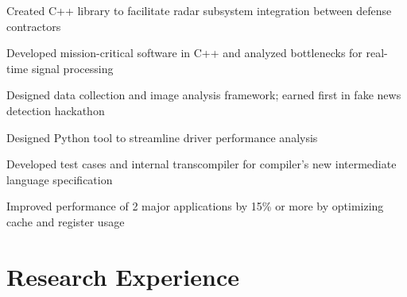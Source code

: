 \documentclass[]{resume-style}
\begin{document}
\vspace{2mm}
\vspace{-1.35mm}
\begin{tightemize}
\vspace{\topsep} %
\item Created C++ library to facilitate radar subsystem integration between defense contractors
\item Developed mission-critical software in C++ and analyzed bottlenecks for real-time signal processing
\item Designed data collection and image analysis framework; earned first in fake news detection hackathon
\end{tightemize}

\vspace{2mm}
\vspace{0.65mm}
\vspace{1.28mm}
\begin{tightemize}
\item Designed Python tool to streamline driver performance analysis
\item Developed test cases and internal transcompiler for compiler's new intermediate language specification
\item Improved performance of 2 major applications by 15\% or more by optimizing cache and register usage%
\end{tightemize}

\vspace{-0.7mm}
\section{\hfill Research Experience \hfill}
\end{document}
